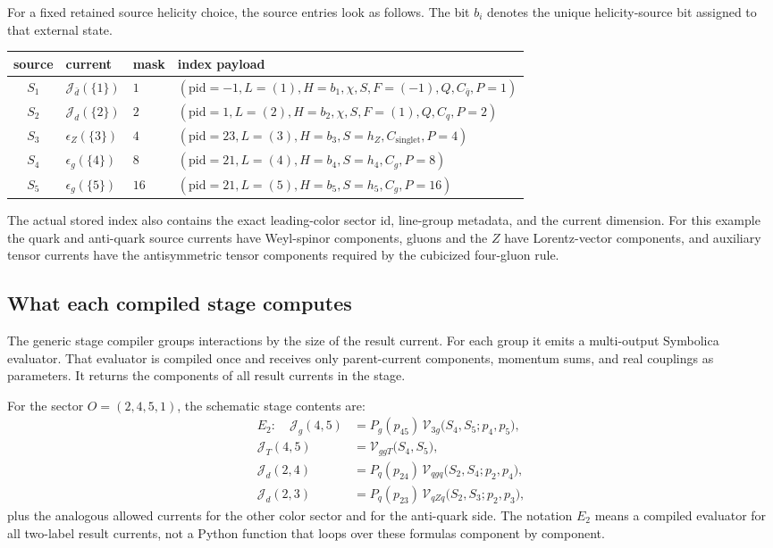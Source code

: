 \documentclass[10pt]{article}
\newcommand{\J}{\mathcal{J}}
\newcommand{\V}{\mathcal{V}}
\begin{document}
For a fixed retained source helicity choice, the source entries look as follows.
The bit $b_i$ denotes the unique helicity-source bit assigned to that external
state.
\begin{center}
\begin{tabular}{@{}c L{1.4in} L{0.85in} L{2.85in}@{}}
\toprule
\textbf{source} & \textbf{current} & \textbf{mask} & \textbf{index payload} \\
\midrule
$S_1$ & $\J_{\bar d}(\{1\})$ & $1$ &
$(\mathrm{pid}=-1,L=(1),H=b_1,\chi,S,F=(-1),Q,C_{\bar q},P=1)$ \\
$S_2$ & $\J_d(\{2\})$ & $2$ &
$(\mathrm{pid}=1,L=(2),H=b_2,\chi,S,F=(1),Q,C_q,P=2)$ \\
$S_3$ & $\epsilon_Z(\{3\})$ & $4$ &
$(\mathrm{pid}=23,L=(3),H=b_3,S=h_Z,C_{\mathrm{singlet}},P=4)$ \\
$S_4$ & $\epsilon_g(\{4\})$ & $8$ &
$(\mathrm{pid}=21,L=(4),H=b_4,S=h_4,C_g,P=8)$ \\
$S_5$ & $\epsilon_g(\{5\})$ & $16$ &
$(\mathrm{pid}=21,L=(5),H=b_5,S=h_5,C_g,P=16)$ \\
\bottomrule
\end{tabular}
\end{center}
The actual stored index also contains the exact leading-color sector id,
line-group metadata, and the current dimension.  For this example the quark
and anti-quark source currents have Weyl-spinor components, gluons and the
$Z$ have Lorentz-vector components, and auxiliary tensor currents have the
antisymmetric tensor components required by the cubicized four-gluon rule.

\subsection*{What each compiled stage computes}

The generic stage compiler groups interactions by the size of the result
current.  For each group it emits a multi-output Symbolica evaluator.  That
evaluator is compiled once and receives only parent-current components,
momentum sums, and real couplings as parameters.  It returns the components of
all result currents in the stage.

For the sector $O=(2,4,5,1)$, the schematic stage contents are:
\begin{align}
E_2:\quad
  \J_g(4,5) &=
    P_g(p_{45})\,\V_{3g}\bigl(S_4,S_5;p_4,p_5\bigr),\\
  \J_T(4,5) &=
    \V_{ggT}\bigl(S_4,S_5\bigr),\\
  \J_d(2,4) &=
    P_q(p_{24})\,\V_{qgq}\bigl(S_2,S_4;p_2,p_4\bigr),\\
  \J_d(2,3) &=
    P_q(p_{23})\,\V_{qZq}\bigl(S_2,S_3;p_2,p_3\bigr),
    \label{eq:e2-stage}
\end{align}
plus the analogous allowed currents for the other color sector and for the
anti-quark side.  The notation $E_2$ means a compiled evaluator for all
two-label result currents, not a Python function that loops over these
formulas component by component.
\end{document}
